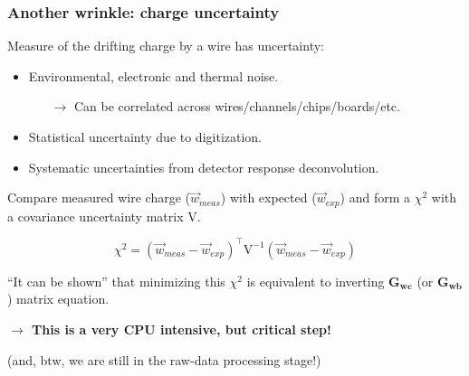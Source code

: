 \documentclass[xcolor=dvipsnames]{beamer}
\begin{document}
\begin{frame}
  \frametitle{Another wrinkle: charge uncertainty}

  Measure of the drifting charge by a wire has uncertainty:
  \begin{itemize}
  \item Environmental, electronic and thermal noise.
    \begin{itemize}\footnotesize
    \item[$\rightarrow$] Can be correlated across wires/channels/chips/boards/etc.
    \end{itemize}
  \item Statistical uncertainty due to digitization.
  \item Systematic uncertainties from detector response deconvolution.
  \end{itemize}
  Compare measured wire charge ($\vec{w}_{meas}$) with expected
  ($\vec{w}_{exp}$) and form a $\chi^2$ with a
  covariance uncertainty matrix $\mathrm{V}$.
  
  \[\chi^2 = (\vec{w}_{meas}-\vec{w}_{exp})^\intercal\mathrm{V}^{-1} (\vec{w}_{meas}-\vec{w}_{exp})\]

  ``It can be shown'' that minimizing this $\chi^2$ is equivalent to
  inverting $\mathbf{G_{wc}}$ (or $\mathbf{G_{wb}}$) matrix equation.


  \begin{center}
    \textbf{$\rightarrow$ This is a very CPU intensive, but critical step!}

    \scriptsize(and, btw, we are still in the raw-data processing stage!)
  \end{center}

\end{frame}
\end{document}
